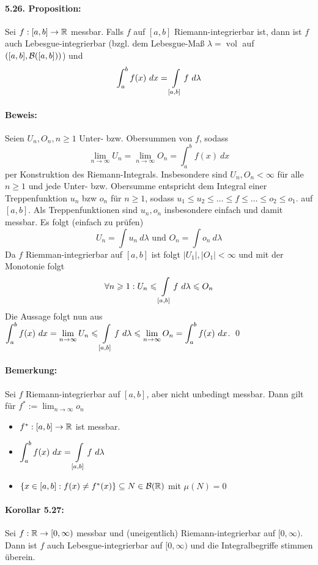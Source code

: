 \documentclass[12pt]{report}
\begin{document}
 \paragraph{5.26. Proposition:}Sei $f:[a,b]\to\R$ messbar. Falls $f$ auf $[a,b]$ Riemann-integrierbar ist, dann ist $f$ auch Lebesgue-integrierbar (bzgl. dem Lebesgue-Ma\ss{} $\lambda=\operatorname{vol}$ auf $([a,b],\cB([a,b]))$) und
 $$\int_a^b f(x)\ dx=\int\displaylimits_{[a,b]}f\ d\lambda$$
 
 \paragraph{Beweis:}Seien $U_n,O_n,n\geq1$ Unter- bzw. Obersummen von $f$, sodass
 $$\lim_{n\to\infty}U_n=\lim_{n\to\infty}O_n=\int_a^b f(x)\ dx$$
 per Konstruktion des Riemann-Integrals. Insbesondere sind $U_n,O_n<\infty$ f\"ur alle $n\geq1$ und jede Unter- bzw. Obersumme entspricht dem Integral einer Treppenfunktion $u_n$ bzw $o_n$ f\"ur $n\geq1$, sodass $u_1\leq u_2\leq\hdots\leq f\leq\hdots\leq o_2\leq o_1$. 
 auf $[a,b]$. Als Treppenfunktionen sind $u_n,o_n$ insbesondere einfach und damit messbar. Es folgt (einfach zu pr\"ufen)
 $$U_n=\int u_n\ d\lambda\text{ und }O_n=\int o_n\ d\lambda$$ 
 Da $f$ Riemman-integrierbar auf $[a,b]$ ist folgt $|U_1|,|O_1|<\infty$ und mit der Monotonie folgt
 $$\forall n\geq1:U_n\leq\int\displaylimits_{[a,b]}f\ d\lambda\leq O_n$$
 Die Aussage folgt nun aus $\displaystyle\int_a^b f(x)\ dx=\lim_{n\to\infty}U_n\leq\int\displaylimits_{[a,b]}f\ d\lambda\leq\lim_{n\to\infty}O_n=\int_a^b f(x)\ dx$. \qed
 
 \paragraph{Bemerkung:}Sei $f$ Riemann-integrierbar auf $[a,b]$, aber nicht unbedingt messbar. Dann gilt f\"ur $f^*:=\displaystyle\lim_{n\to\infty}o_n$
 \begin{itemize}
     \item $f^*:[a,b]\to\R$ ist messbar.
     \item $\displaystyle\int_a^b f(x)\ dx=\int\displaylimits_{[a,b]}f\ d\lambda$
     \item $\left\{x\in[a,b]:f(x)\neq f^*(x)\right\}\subseteq N\in\borel$ mit $\mu(N)=0$
 \end{itemize}
 
 \paragraph{Korollar 5.27:} Sei $f:\R\to[0,\infty)$ messbar und (uneigentlich) Riemann-integrierbar auf $[0,\infty)$. Dann ist $f$ auch Lebesgue-integrierbar auf $[0,\infty)$ und die Integralbegriffe stimmen \"uberein.
 
\end{document}
